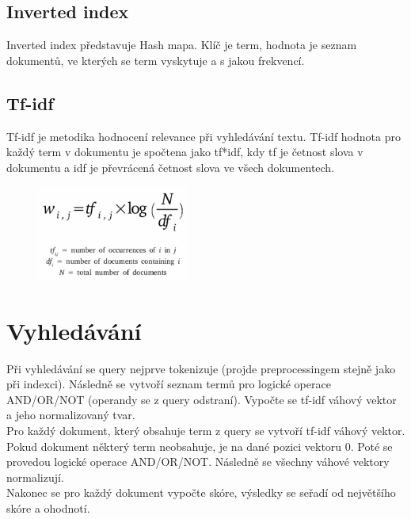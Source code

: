 \section{Inverted index}
Inverted index představuje Hash mapa. Klíč je term, hodnota je seznam dokumentů, ve kterých se term vyskytuje a s jakou frekvencí.

\section{Tf-idf}
Tf-idf je metodika hodnocení relevance při vyhledávání textu. Tf-idf hodnota pro každý term v dokumentu je spočtena jako tf*idf, kdy tf je četnost slova v dokumentu a idf je převrácená četnost slova ve všech dokumentech.

\begin{figure}[h]
\includegraphics[width=5cm]{tfidf}
\centering
\end{figure}



\chapter{Vyhledávání}
Při vyhledávání se query nejprve tokenizuje (projde preprocessingem stejně jako při indexci). Následně se vytvoří seznam termů pro logické operace AND/OR/NOT (operandy se z query odstraní). Vypočte se tf-idf váhový vektor a jeho normalizovaný tvar.\\

Pro každý dokument, který obsahuje term z query se vytvoří tf-idf váhový vektor. Pokud dokument některý term neobsahuje, je na dané pozici vektoru 0. Poté se provedou logické operace AND/OR/NOT. Následně se všechny váhové vektory normalizují.\\

Nakonec se pro každý dokument vypočte skóre, výsledky se seřadí od největšího skóre a ohodnotí.

